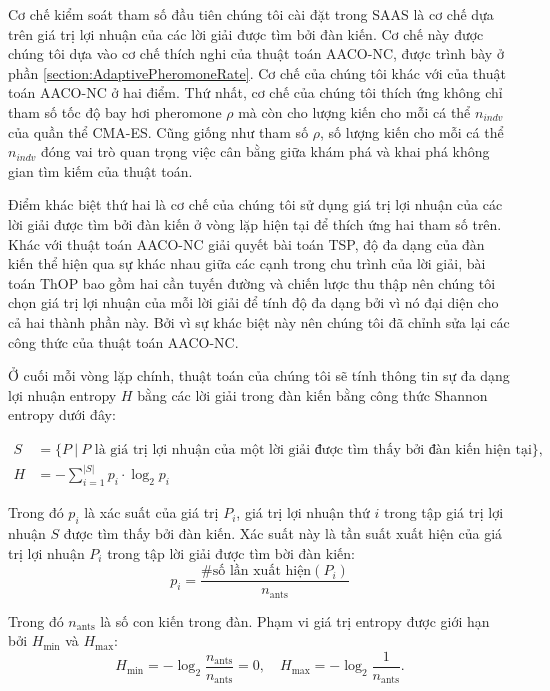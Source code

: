 Cơ chế kiểm soát tham số đầu tiên chúng tôi cài đặt trong SAAS là cơ chế dựa trên giá trị lợi nhuận của các lời giải được tìm bởi đàn kiến. Cơ chế này được chúng tôi dựa vào cơ chế thích nghi của thuật toán AACO-NC\cite{STODOLA2022101056}, được trình bày ở phần \ref{section:AdaptivePheromoneRate}. Cơ chế của chúng tôi khác với của thuật toán AACO-NC ở hai điểm. Thứ nhất, cơ chế của chúng tôi thích ứng không chỉ tham số tốc độ bay hơi pheromone $\rho$ mà còn cho lượng kiến cho mỗi cá thể $n_{indv}$ của quần thể CMA-ES. Cũng giống như tham số $\rho$, số lượng kiến cho mỗi cá thể $n_{indv}$ đóng vai trò quan trọng việc cân bằng giữa khám phá và khai phá không gian tìm kiếm của thuật toán. 

Điểm khác biệt thứ hai là cơ chế của chúng tôi sử dụng giá trị lợi nhuận của các lời giải được tìm bởi đàn kiến ở vòng lặp hiện tại để thích ứng hai tham số trên. Khác với thuật toán AACO-NC giải quyết bài toán TSP, độ đa dạng của đàn kiến thể hiện qua sự khác nhau giữa các cạnh trong chu trình của lời giải, bài toán ThOP bao gồm hai cần tuyến đường và chiến lược thu thập nên chúng tôi chọn giá trị lợi nhuận của mỗi lời giải để tính độ đa dạng bởi vì nó đại diện cho cả hai thành phần này. Bởi vì sự khác biệt này nên chúng tôi đã chỉnh sửa lại các công thức của thuật toán AACO-NC.


Ở cuối mỗi vòng lặp chính, thuật toán của chúng tôi sẽ tính thông tin sự đa dạng lợi nhuận entropy $H$ bằng các lời giải trong đàn kiến bằng công thức Shannon entropy dưới đây:

\begin{equation}\label{eq:entropy}
\begin{split}
    S &= \{P\  |\ \text{$P$ là giá trị lợi nhuận của một lời giải được tìm thấy bởi đàn kiến hiện tại}\} ,\\
    H &= -\sum_{i=1}^{|S|} p_{i} \cdot \log_2 p_{i}
\end{split}
\end{equation}

Trong đó $p_{i}$ là xác suất của giá trị $P_i$, giá trị lợi nhuận thứ $i$ trong tập giá trị lợi nhuận $S$ được tìm thấy bởi đàn kiến. Xác suất này là tần suất xuất hiện của giá trị lợi nhuận $P_i$ trong tập lời giải được tìm bời đàn kiến:
\begin{equation}\label{eq:entropy_prob}
    p_{i} = \frac{\text{\# số lần xuất hiện}(P_{i})}{n_{\text{ants}}}
\end{equation}

Trong đó $n_{\text{ants}}$ là số con kiến trong đàn. Phạm vi giá trị entropy được giới hạn bởi $H_{\text{min}}$ và $H_{\text{max}}$:
\begin{equation}\label{eq:limit_entropy}
   H_{\text{min}} = -\log_2\frac{n_{\text{ants}}}{n_{\text{ants}}} = 0, \quad
   H_{\text{max}} = -\log_2\frac{1}{n_{\text{ants}}} .
\end{equation}

